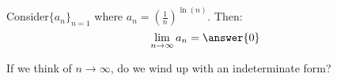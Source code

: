 \documentclass{ximera}
\author{Jim Talamo}
\begin{document}
\begin{exercise}

Consider$\{a_n \}_{n=1}$ where $a_n =\left(\frac{1}{n}\right)^{\ln(n)}$.  Then:
\[
\lim_{n \to \infty} a_n = \answer{0}
\]

\begin{hint}
If we think of $n \to \infty$, do we wind up with an indeterminate form?
\end{hint}

\end{exercise}
\end{document}

